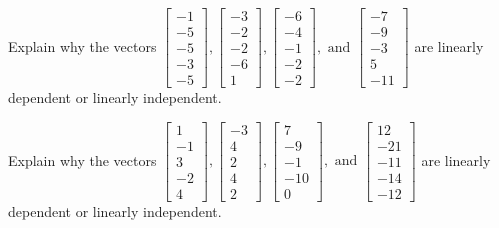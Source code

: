\documentclass{article}
\begin{document}
\begin{exerciseStatement}
    Explain why the vectors \(\left[\begin{array}{r}
-1 \\
-5 \\
-5 \\
-3 \\
-5
\end{array}\right] , \left[\begin{array}{r}
-3 \\
-2 \\
-2 \\
-6 \\
1
\end{array}\right] , \left[\begin{array}{r}
-6 \\
-4 \\
-1 \\
-2 \\
-2
\end{array}\right] , \text{ and } \left[\begin{array}{r}
-7 \\
-9 \\
-3 \\
5 \\
-11
\end{array}\right]\) are linearly dependent or linearly independent.


  
\end{exerciseStatement}

\begin{exerciseStatement}
    Explain why the vectors \(\left[\begin{array}{r}
1 \\
-1 \\
3 \\
-2 \\
4
\end{array}\right] , \left[\begin{array}{r}
-3 \\
4 \\
2 \\
4 \\
2
\end{array}\right] , \left[\begin{array}{r}
7 \\
-9 \\
-1 \\
-10 \\
0
\end{array}\right] , \text{ and } \left[\begin{array}{r}
12 \\
-21 \\
-11 \\
-14 \\
-12
\end{array}\right]\) are linearly dependent or linearly independent.


  
\end{exerciseStatement}
\end{document}

